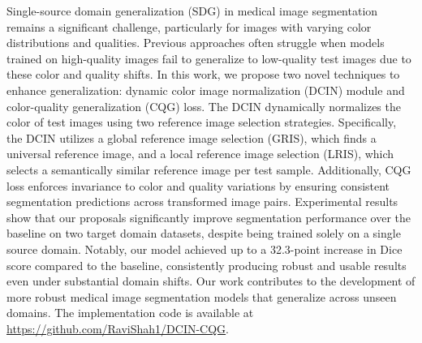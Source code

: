 Single-source domain generalization (SDG) in medical image segmentation remains a significant challenge, particularly for images with varying color distributions and qualities. 
Previous approaches often struggle when models trained on high-quality images fail to generalize to low-quality test images due to these color and quality shifts. 
In this work, we propose two novel techniques to enhance generalization: dynamic color image normalization (DCIN) module and color-quality generalization (CQG) loss. 
The DCIN dynamically normalizes the color of test images using two reference image selection strategies. 
Specifically, the DCIN utilizes a global reference image selection (GRIS), which finds a universal reference image, and a local reference image selection (LRIS), which selects a semantically similar reference image per test sample. 
Additionally, CQG loss enforces invariance to color and quality variations by ensuring consistent segmentation predictions across transformed image pairs. 
Experimental results show that our proposals significantly improve segmentation performance over the baseline on two target domain datasets, despite being trained solely on a single source domain. 
Notably, our model achieved up to a 32.3-point increase in Dice score compared to the baseline, consistently producing robust and usable results even under substantial domain shifts. 
Our work contributes to the development of more robust medical image segmentation models that generalize across unseen domains.
The implementation code is available at \url{https://github.com/RaviShah1/DCIN-CQG}.
